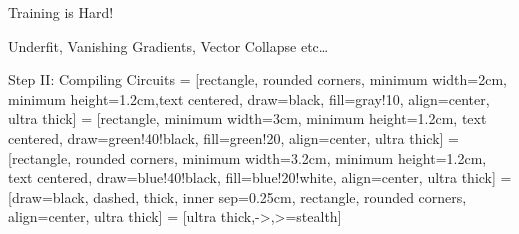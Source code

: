 \documentclass{zkdl-presentation-template}
\begin{document}
\begin{frame}{Training is Hard!}
        \begin{center}
            Underfit, Vanishing Gradients, Vector Collapse etc\ldots
        \end{center}
    \end{frame}

    \begin{frame}{Step II: Compiling Circuits}
         = [rectangle, rounded corners, minimum width=2cm, minimum height=1.2cm,text centered, draw=black, fill=gray!10, align=center, ultra thick]
         = [rectangle, minimum width=3cm, minimum height=1.2cm, text centered, draw=green!40!black, fill=green!20, align=center, ultra thick]
         = [rectangle, rounded corners, minimum width=3.2cm, minimum height=1.2cm, text centered, draw=blue!40!black, fill=blue!20!white, align=center, ultra thick]
         = [draw=black, dashed, thick, inner sep=0.25cm, rectangle, rounded corners, align=center, ultra thick]
         = [ultra thick,->,>=stealth]
        \begin{figure}[H]
            \centering
\end{figure}
\end{frame}
\end{document}
